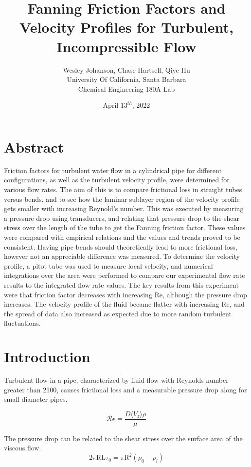 \documentclass{article}
\title{Fanning Friction Factors and Velocity Profiles for Turbulent, Incompressible Flow}
\author{ Wesley Johanson, Chase Hartsell, Qiye Hu\\
        \small University Of California, Santa Barbara \\
        \small Chemical Engineering 180A Lab
        }
\date{April $13^{th}$, 2022}
\begin{document}
\maketitle


\noindent
\section*{Abstract}

Friction factors for turbulent water flow in a cylindrical pipe for different configurations, as well as the turbulent velocity profile, were determined for various flow rates. The aim of this is to compare frictional loss in straight tubes versus bends, and to see how the laminar sublayer region of the velocity profile gets smaller with increasing Reynold’s number. This was executed by measuring a pressure drop using transducers, and relating that pressure drop to the shear stress over the length of the tube to get the Fanning friction factor. These values were compared with empirical relations and the values and trends proved to be consistent. Having pipe bends should theoretically lead to more frictional loss, however not an appreciable difference was measured. To determine the velocity profile, a pitot tube was used to measure local velocity, and numerical integrations over the area were performed to compare our experimental flow rate results to the integrated flow rate values. The key results from this experiment were that friction factor decreases with increasing Re, although the pressure drop increases. The velocity profile of the fluid became flatter with increasing Re, and the spread of data also increased as expected due to more random turbulent fluctuations. 

\raggedright
\section*{Introduction}
Turbulent flow in a pipe, characterized by fluid flow with Reynolds number greater than 2100, causes frictional loss and a measurable pressure drop along for small diameter pipes.

\begin{equation} \label{eq:1}
\mathcal{Re} = \frac{D\langle V_{z} \rangle\rho}{\mu}
\end{equation}


The pressure drop can be related to the shear stress over the surface area of the viscous flow.\\

\begin{equation} \label{eq:2} 
2\pi\mathrm{RL}\tau_{0}=\pi\mathrm{R^2}\left(\rho_{0}-\rho_{l}\right) 
\end{equation}
\end{document}
